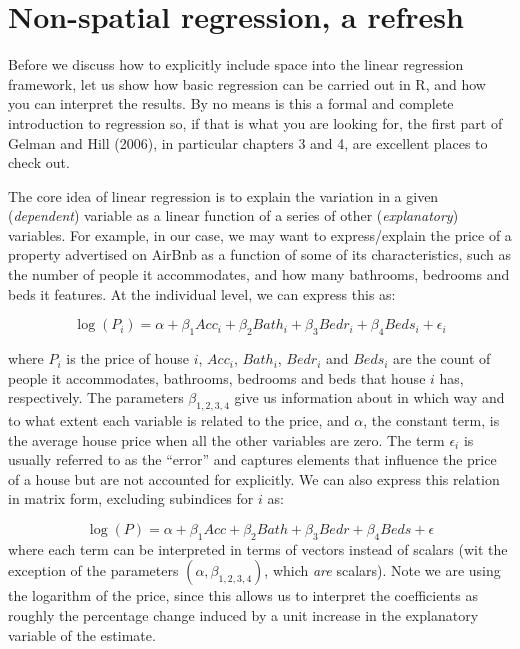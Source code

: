 \documentclass[
  letterpaper,
  krantz2]{style/krantz}
\begin{document}
\hypertarget{non-spatial-regression-a-refresh}{%
\section{Non-spatial regression, a
refresh}\label{non-spatial-regression-a-refresh}}

Before we discuss how to explicitly include space into the linear
regression framework, let us show how basic regression can be carried
out in R, and how you can interpret the results. By no means is this a
formal and complete introduction to regression so, if that is what you
are looking for, the first part of Gelman and Hill (2006), in particular
chapters 3 and 4, are excellent places to check out.

The core idea of linear regression is to explain the variation in a
given (\emph{dependent}) variable as a linear function of a series of
other (\emph{explanatory}) variables. For example, in our case, we may
want to express/explain the price of a property advertised on AirBnb as
a function of some of its characteristics, such as the number of people
it accommodates, and how many bathrooms, bedrooms and beds it features.
At the individual level, we can express this as:

\[
\log(P_i) = \alpha + \beta_1 Acc_i + \beta_2 Bath_i + \beta_3 Bedr_i + \beta_4 Beds_i + \epsilon_i
\]

where \(P_i\) is the price of house \(i\), \(Acc_i\), \(Bath_i\),
\(Bedr_i\) and \(Beds_i\) are the count of people it accommodates,
bathrooms, bedrooms and beds that house \(i\) has, respectively. The
parameters \(\beta_{1,2, 3, 4}\) give us information about in which way
and to what extent each variable is related to the price, and
\(\alpha\), the constant term, is the average house price when all the
other variables are zero. The term \(\epsilon_i\) is usually referred to
as the ``error'' and captures elements that influence the price of a
house but are not accounted for explicitly. We can also express this
relation in matrix form, excluding subindices for \(i\) as:

\[
\log(P) = \alpha + \beta_1 Acc + \beta_2 Bath + \beta_3 Bedr + \beta_4 Beds + \epsilon
\] where each term can be interpreted in terms of vectors instead of
scalars (wit the exception of the parameters
\((\alpha, \beta_{1, 2, 3, 4})\), which \emph{are} scalars). Note we are
using the logarithm of the price, since this allows us to interpret the
coefficients as roughly the percentage change induced by a unit increase
in the explanatory variable of the estimate.
\end{document}
